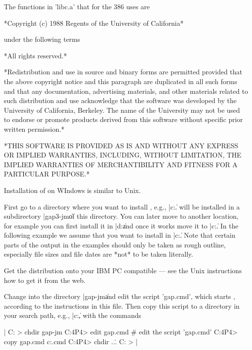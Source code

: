 The functions in 'libc.a' that {\GAP} for the 386 uses are

*Copyright (c) 1988 Regents of the University of California*

under the following terms

*All rights reserved.*

*Redistribution and use in source and binary forms are permitted provided
that the above copyright notice and this paragraph are  duplicated in all
such forms and that  any documentation, advertising  materials, and other
materials  related to  such  distribution and  use acknowledge  that  the
software  was developed by  the University of California, Berkeley.   The
name  of the University  may not be  used to endorse or promote  products
derived from this software without specific prior written permission.*

*THIS  SOFTWARE  IS  PROVIDED AS IS  AND WITHOUT  ANY EXPRESS OR  IMPLIED
WARRANTIES,  INCLUDING,  WITHOUT  LIMITATION, THE  IMPLIED WARRANTIES  OF
MERCHANTIBILITY AND FITNESS FOR A PARTICULAR PURPOSE.*

%

Installation of {\GAP} on WIndows is similar to Unix. 

First go to a directory where  you  want to install  {\GAP}, e.g., |c:\|.
{\GAP} will be installed in a subdirectory |gap3-jm\| of this directory.
You can later move {\GAP} to another location, for  example you can first
install it in  |d:\tmp\| and once  it works move it  to  |c:\|.   In  the
following  example we assume that  you want  to install {\GAP} in  |c:\|.
Note that  certain parts of  the output in the examples  should  only  be
taken as rough outline, especially file sizes and file dates are *not* to
be taken literally.

Get  the {\GAP} distribution onto your IBM PC  compatible --- see the Unix
instructions how to get it from the web.

Change into the directory |gap-jm\bin\| and  edit the script 'gap.cmd',
which starts {\GAP}, according  to the instructions in  this  file.  Then
copy  this  script to a  directory in your  search path, e.g., |c:\bin\|,
with the commands

|    C: > chdir gap-jm\bin
    C:\GAPR4P4\BIN > edit gap.cmd
    # edit the script 'gap.cmd'
    C:\GAPR4P4\BIN > copy gap.cmd c:\bin\gap.cmd
    C:\GAPR4P4\BIN > chdir ..\..
    C: > |


